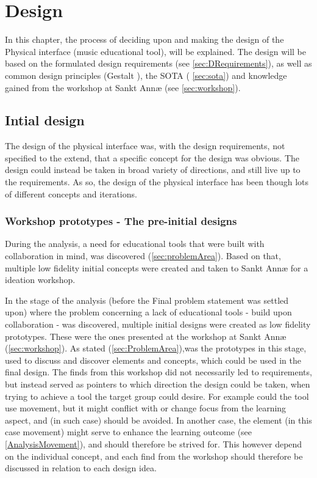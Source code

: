 \chapter{Design}

In this chapter, the process of deciding upon and making the design of the Physical interface (music educational tool), will be explained. The design will be based on the formulated design requirements (see \autoref{sec:DRequirements}), as well as common design principles (Gestalt \cite{gestalt}), the SOTA ( \autoref{sec:sota}) and knowledge gained from the workshop at Sankt Annæ (see \autoref{sec:workshop}). 


\section{Intial design}
The design of the physical interface was, with the design requirements, not specified to the extend, that a specific concept for the design was obvious. The design could instead be taken in broad variety of directions, and still live up to the requirements. As so, the design of the physical interface has been though lots of different concepts and iterations. 

\subsection {Workshop prototypes - The pre-initial designs}
During the analysis, a need for educational tools that were built with collaboration in mind, was discovered (\autoref{sec:problemArea}). Based on that, multiple low fidelity initial concepts were created and taken to Sankt Annæ for a ideation workshop. 

In the stage of the analysis (before the Final problem statement was settled upon) where the problem concerning a lack of educational tools - build upon collaboration - was discovered, multiple initial designs were created as low fidelity prototypes. These were the ones presented at the workshop at Sankt Annæ (\autoref{sec:workshop}). As stated (\autoref{sec:ProblemArea}),was the prototypes in this stage, used to discuss and discover elements and concepts, which could be used in the final design. The finds from this workshop did not necessarily led to requirements, but instead served as pointers to which direction the design could be taken, when trying to achieve a tool the target group could desire. For example could the tool use movement, but it might conflict with or change focus from the learning aspect, and (in such case) should be avoided. In another case, the element (in this case movement) might serve to enhance the learning outcome (see \autoref{AnalysisMovement}), and should therefore be strived for. This however depend on the individual concept, and each find from the workshop should therefore be discussed in relation to each design idea. 
\\\\

